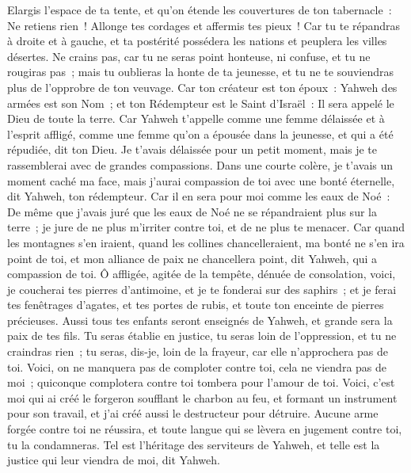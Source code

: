 \begin{multicols}{2}
Elargis l'espace de ta tente, et qu'on étende les couvertures de ton tabernacle~: Ne retiens rien~! Allonge tes cordages et affermis tes pieux~!
Car tu te répandras à droite et à gauche, et ta postérité possédera les nations et peuplera les villes désertes.
Ne crains pas, car tu ne seras point honteuse, ni confuse, et tu ne rougiras pas~; mais tu oublieras la honte de ta jeunesse, et tu ne te souviendras plus de l'opprobre de ton veuvage.
Car ton créateur est ton époux~: Yahweh des armées est son Nom~; et ton Rédempteur est le Saint d'Israël~: Il sera appelé le Dieu de toute la terre.
Car Yahweh t'appelle comme une femme délaissée et à l'esprit affligé, comme une femme qu'on a épousée dans la jeunesse, et qui a été répudiée, dit ton Dieu.
Je t'avais délaissée pour un petit moment, mais je te rassemblerai avec de grandes compassions.
Dans une courte colère, je t'avais un moment caché ma face, mais j'aurai compassion de toi avec une bonté éternelle, dit Yahweh, ton rédempteur.
Car il en sera pour moi comme les eaux de Noé~: De même que j'avais juré que les eaux de Noé ne se répandraient plus sur la terre~; je jure de ne plus m'irriter contre toi, et de ne plus te menacer.
Car quand les montagnes s'en iraient, quand les collines chancelleraient, ma bonté ne s'en ira point de toi, et mon alliance de paix ne chancellera point, dit Yahweh, qui a compassion de toi.
Ô affligée, agitée de la tempête, dénuée de consolation, voici, je coucherai tes pierres d'antimoine, et je te fonderai sur des saphirs~;
et je ferai tes fenêtrages d'agates, et tes portes de rubis, et toute ton enceinte de pierres précieuses.
Aussi tous tes enfants seront enseignés de Yahweh, et grande sera la paix de tes fils.
Tu seras établie en justice, tu seras loin de l'oppression, et tu ne craindras rien~; tu seras, dis-je, loin de la frayeur, car elle n'approchera pas de toi.
Voici, on ne manquera pas de comploter contre toi, cela ne viendra pas de moi~; quiconque complotera contre toi tombera pour l'amour de toi.
Voici, c'est moi qui ai créé le forgeron soufflant le charbon au feu, et formant un instrument pour son travail, et j'ai créé aussi le destructeur pour détruire.
Aucune arme forgée contre toi ne réussira, et toute langue qui se lèvera en jugement contre toi, tu la condamneras. Tel est l'héritage des serviteurs de Yahweh, et telle est la justice qui leur viendra de moi, dit Yahweh.

\end{multicols}
